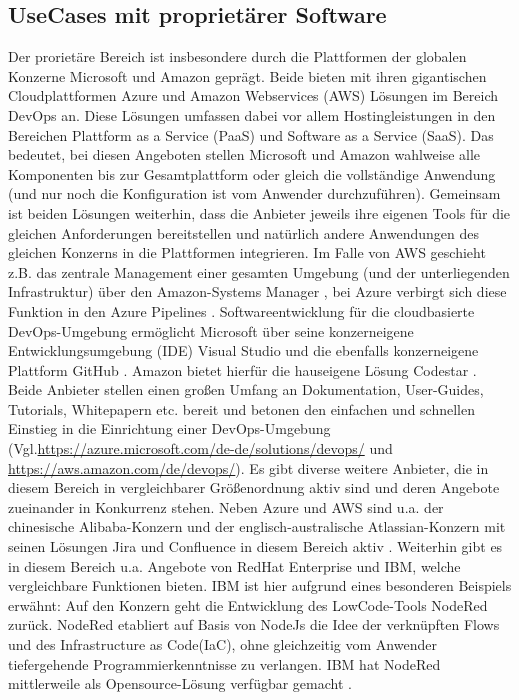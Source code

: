 \subsection{UseCases mit proprietärer Software}
\label{UseCases mit proprietärer Software}
Der prorietäre Bereich ist insbesondere durch die Plattformen der globalen Konzerne Microsoft und Amazon geprägt. Beide bieten mit ihren gigantischen Cloudplattformen Azure und Amazon Webservices (\acrshort{AWS}) Lösungen im Bereich \gls{DevOps} an. Diese Lösungen umfassen dabei vor allem Hostingleistungen in den Bereichen Plattform as a Service (\acrshort{PaaS}) und Software as a Service (\acrshort{SaaS}). Das bedeutet, bei diesen Angeboten stellen Microsoft und Amazon wahlweise alle Komponenten bis zur Gesamtplattform oder gleich die vollständige Anwendung (und nur noch die Konfiguration ist vom Anwender durchzuführen).
Gemeinsam ist beiden Lösungen weiterhin, dass die Anbieter jeweils ihre eigenen Tools für die gleichen Anforderungen bereitstellen und natürlich andere Anwendungen des gleichen Konzerns in die Plattformen integrieren.
Im Falle von \acrshort{AWS} geschieht z.B. das zentrale Management einer gesamten Umgebung (und der unterliegenden Infrastruktur) über den Amazon-Systems Manager \cite{aws_systems_manager}, bei Azure verbirgt sich diese Funktion in den Azure Pipelines \cite{azure_devops_loesungen}.
Softwareentwicklung für die cloudbasierte \gls{DevOps}-Umgebung ermöglicht Microsoft über seine konzerneigene Entwicklungsumgebung (\acrshort{IDE}) Visual Studio und die ebenfalls konzerneigene Plattform  GitHub \cite{azure_devops_loesungen}. Amazon bietet hierfür die hauseigene Lösung Codestar \cite{aws_codestar}.
Beide Anbieter stellen einen großen Umfang an Dokumentation, User-Guides, Tutorials, Whitepapern etc. bereit und betonen den einfachen und schnellen Einstieg in die Einrichtung einer \gls{DevOps}-Umgebung (Vgl.\url{https://azure.microsoft.com/de-de/solutions/devops/} und \url{https://aws.amazon.com/de/devops/}).\newline
Es gibt diverse weitere Anbieter, die in diesem Bereich in vergleichbarer Größenordnung aktiv sind und deren Angebote zueinander in Konkurrenz stehen. Neben Azure und \acrshort{AWS} sind u.a. der chinesische Alibaba-Konzern \cite{alibaba_devops} und der englisch-australische Atlassian-Konzern mit seinen Lösungen Jira und Confluence in diesem Bereich aktiv \cite{atlassian_jira_nodate}. 
Weiterhin gibt es in diesem Bereich u.a. Angebote von RedHat Enterprise \cite{redhat_openshift_2017} und IBM, welche vergleichbare Funktionen bieten. IBM ist hier aufgrund eines besonderen Beispiels erwähnt: Auf den Konzern geht die Entwicklung des \gls{LowCode}-Tools NodeRed zurück. NodeRed etabliert auf Basis von NodeJs die Idee der verknüpften Flows und des \glqq{}Infrastructure as Code\grqq (\acrshort{IaC}), ohne gleichzeitig vom Anwender tiefergehende Programmierkenntnisse zu verlangen. IBM hat NodeRed mittlerweile als Opensource-Lösung verfügbar gemacht \cite{nodered_about}.

